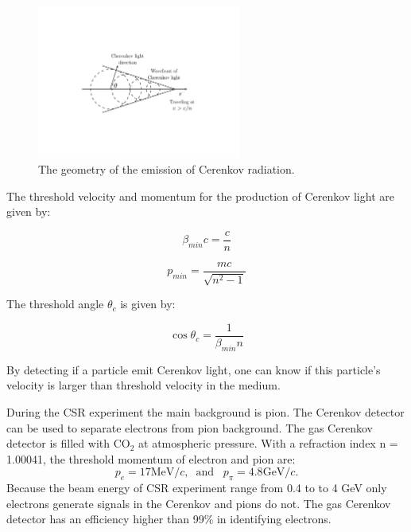 \begin{figure}[!htp]
\centering
\includegraphics[width=0.6\textwidth]{figs/Cherenkov-radiation.pdf}
\caption[Cerenkov radiation]{The geometry of the emission of Cerenkov radiation.
\label{fig:Cerenkov-radiation}} 
\end{figure}

The threshold velocity and momentum for the production of Cerenkov light are given by:

\begin{equation} \label{Cerenkov_theshold_v}
\beta_{min} c = \frac{c}{n}
\end{equation}

\begin{equation} \label{Cerenkov_theshold_p}
p_{min} = \frac{mc}{\sqrt{n^2-1}}
\end{equation}

The threshold angle $\theta_c$ is given by: 

\begin{equation} \label{Cerenkov_direction}
\cos \theta_c = \frac{1}{\beta_{min} n}
\end{equation}

By detecting if a particle emit Cerenkov light, one can know if this particle's velocity is larger than threshold velocity
in the medium.



During the CSR experiment the main background is pion. The Cerenkov detector can be used to separate 
electrons from pion background.
The gas Cerenkov detector is filled with CO$_2$ at atmospheric pressure.
With a refraction index n = 1.00041, the threshold momentum of electron and pion are:
\begin{equation} 
p_e = 17 \mathrm{MeV}/c, \;\; \mathrm{and} \;\;\;  p_{\pi} = 4.8 \mathrm{GeV}/c.
\end{equation}
Because the beam energy of CSR experiment range from 0.4 to to 4 GeV only electrons generate signals in the
Cerenkov and pions do not. The gas Cerenkov detector has an efficiency higher than 99\% in
identifying electrons.


